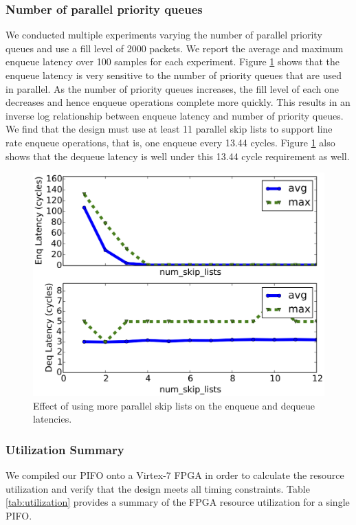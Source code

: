 \subsubsection*{Number of parallel priority queues}
We conducted multiple experiments varying the number of parallel priority queues and use a fill level of 2000 packets. We report the average and maximum enqueue latency over 100 samples for each experiment. Figure \ref{fig:num_skip_lists} shows that the enqueue latency is very sensitive to the number of priority queues that are used in parallel. As the number of priority queues increases, the fill level of each one decreases and hence enqueue operations complete more quickly. This results in an inverse log relationship between enqueue latency and number of priority queues. We find that the design must use at least 11 parallel skip lists to support line rate enqueue operations, that is, one enqueue every 13.44 cycles. Figure \ref{fig:num_skip_lists} also shows that the dequeue latency is well under this 13.44 cycle requirement as well.

\begin{figure}[!h]
\includegraphics[width=1\linewidth]{figures/eval/enq_deq_v_num_skip_lists}
\caption{Effect of using more parallel skip lists on the enqueue and dequeue latencies.}
\label{fig:num_skip_lists}
\end{figure}


\subsubsection*{Utilization Summary}
We compiled our PIFO onto a Virtex-7 FPGA in order to calculate the resource utilization and verify that the design meets all timing constraints. Table \ref{tab:utilization} provides a summary of the FPGA resource utilization for a single PIFO.


